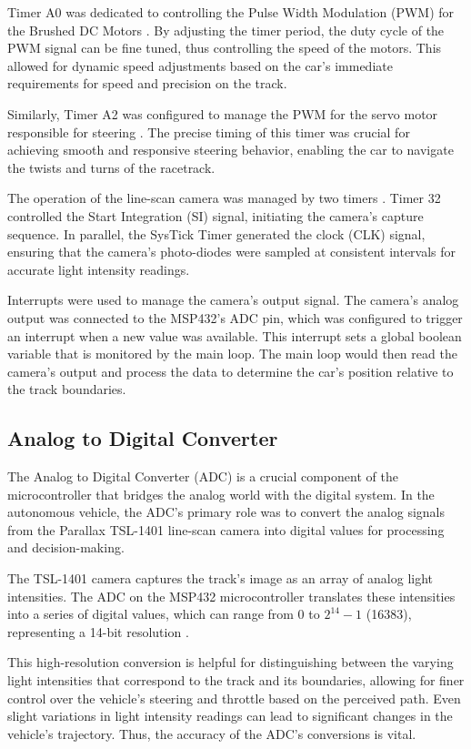 \documentclass[conference]{IEEEtran}
\begin{document}
Timer A0 was dedicated to controlling the Pulse Width Modulation (PWM) for the Brushed DC Motors \cite{timers}. By adjusting the timer period, the duty cycle of the PWM signal can be fine tuned, thus controlling the speed of the motors. This allowed for dynamic speed adjustments based on the car's immediate requirements for speed and precision on the track.

Similarly, Timer A2 was configured to manage the PWM for the servo motor responsible for steering  \cite{timers}. The precise timing of this timer was crucial for achieving smooth and responsive steering behavior, enabling the car to navigate the twists and turns of the racetrack.

The operation of the line-scan camera was managed by two timers \cite{labManual}. Timer 32 controlled the Start Integration (SI) signal, initiating the camera's capture sequence. In parallel, the SysTick Timer generated the clock (CLK) signal, ensuring that the camera's photo-diodes were sampled at consistent intervals for accurate light intensity readings.

Interrupts were used to manage the camera's output signal. The camera's analog output was connected to the MSP432's ADC pin, which was configured to trigger an interrupt when a new value was available. This interrupt sets a global boolean variable that is monitored by the main loop. The main loop would then read the camera's output and process the data to determine the car's position relative to the track boundaries.

\subsection{Analog to Digital Converter}

The Analog to Digital Converter (ADC) is a crucial component of the microcontroller that bridges the analog world with the digital system. In the autonomous vehicle, the ADC's primary role was to convert the analog signals from the Parallax TSL-1401 line-scan camera into digital values for processing and decision-making.

The TSL-1401 camera captures the track's image as an array of analog light intensities. The ADC on the MSP432 microcontroller translates these intensities into a series of digital values, which can range from 0 to $2^{14} - 1$ (16383), representing a 14-bit resolution \cite{adc}.

This high-resolution conversion is helpful for distinguishing between the varying light intensities that correspond to the track and its boundaries, allowing for finer control over the vehicle's steering and throttle based on the perceived path. Even slight variations in light intensity readings can lead to significant changes in the vehicle's trajectory. Thus, the accuracy of the ADC's conversions is vital.
\end{document}
